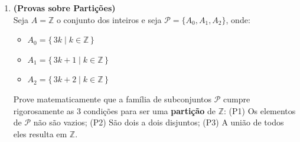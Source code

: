 \documentclass[12pt]{article}
\begin{document}
\begin{enumerate}
\vspace{0.3cm}
\item \textbf{(Provas sobre Partições)}\\
Seja $A = \mathbb{Z}$ o conjunto dos inteiros e seja $\mathcal{P} = \{A_0, A_1, A_2\}$, onde:
\begin{itemize}
    \item $A_0 = \{\,3k \mid k \in \mathbb{Z}\,\}$
    \item $A_1 = \{\,3k + 1 \mid k \in \mathbb{Z}\,\}$
    \item $A_2 = \{\,3k + 2 \mid k \in \mathbb{Z}\,\}$
\end{itemize}
Prove matematicamente que a família de subconjuntos $\mathcal{P}$ cumpre rigorosamente as 3 condições para ser uma \textbf{partição} de $\mathbb{Z}$: 
(P1) Os elementos de $\mathcal{P}$ não são vazios; (P2) São dois a dois disjuntos; (P3) A união de todos eles resulta em $\mathbb{Z}$.

\end{enumerate}
\end{document}
